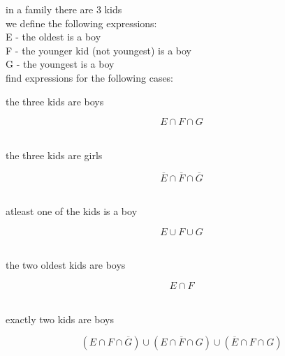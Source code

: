\documentclass[a4paper,12pt]{article}
\begin{document}
\begin{definition}
\begin{lemma}
\begin{my_example}
\end{my_example}
\end{lemma}
\begin{my_example}
in a family there are 3 kids\\
we define the following expressions:\\
E - the oldest is a boy\\
F - the younger kid (not youngest) is a boy\\
G - the youngest is a boy\\
find expressions for the following cases:\\
\begin{subquestion}
the three kids are boys\\
\begin{answer}
\[
E \cap F \cap G
\]\\
\end{answer}
\end{subquestion}
\begin{subquestion}
the three kids are girls\\
\begin{answer}
\[
\overline{E} \cap \overline{F} \cap \overline{G}
\]\\
\end{answer}
\end{subquestion}
\begin{subquestion}
atleast one of the kids is a boy\\
\begin{answer}
\[
E \cup F \cup G
\]\\
\end{answer}
\end{subquestion}
\begin{subquestion}
the two oldest kids are boys\\
\begin{answer}
\[
E \cap F
\]\\
\end{answer}
\end{subquestion}
\begin{subquestion}
exactly two kids are boys\\
\begin{answer}
\[
(E \cap F \cap \overline{G}) \cup (E \cap \overline{F} \cap G) \cup (\overline{E} \cap F \cap G)
\]\\
\end{answer}
\end{subquestion}
\end{my_example}
\begin{question}

\end{question}
\end{definition}
\end{document}
